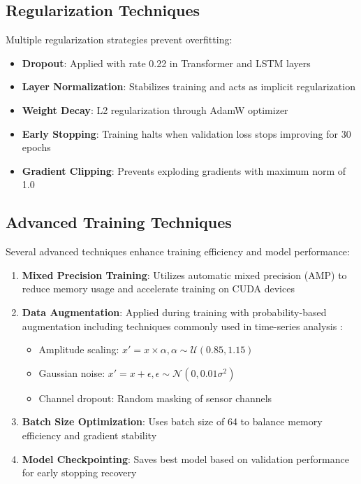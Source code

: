\subsection{Regularization Techniques}
\label{subsec:regularization}

Multiple regularization strategies prevent overfitting:

\begin{itemize}
    \item \textbf{Dropout}: Applied with rate 0.22 in Transformer and LSTM layers
    \item \textbf{Layer Normalization}: Stabilizes training and acts as implicit regularization
    \item \textbf{Weight Decay}: L2 regularization through AdamW optimizer
    \item \textbf{Early Stopping}: Training halts when validation loss stops improving for 30 epochs
    \item \textbf{Gradient Clipping}: Prevents exploding gradients with maximum norm of 1.0
\end{itemize}

\subsection{Advanced Training Techniques}
\label{subsec:advanced_training}

Several advanced techniques enhance training efficiency and model performance:

\begin{enumerate}
    \item \textbf{Mixed Precision Training}: Utilizes automatic mixed precision (AMP) to reduce memory usage and accelerate training on CUDA devices
    
    \item \textbf{Data Augmentation}: Applied during training with probability-based augmentation including techniques commonly used in time-series analysis \citep{wen2021time}:
    \begin{itemize}
        \item Amplitude scaling: $x' = x \times \alpha, \alpha \sim \mathcal{U}(0.85, 1.15)$
        \item Gaussian noise: $x' = x + \epsilon, \epsilon \sim \mathcal{N}(0, 0.01\sigma^2)$
        \item Channel dropout: Random masking of sensor channels
    \end{itemize}
    
    \item \textbf{Batch Size Optimization}: Uses batch size of 64 to balance memory efficiency and gradient stability
    
    \item \textbf{Model Checkpointing}: Saves best model based on validation performance for early stopping recovery
\end{enumerate}

